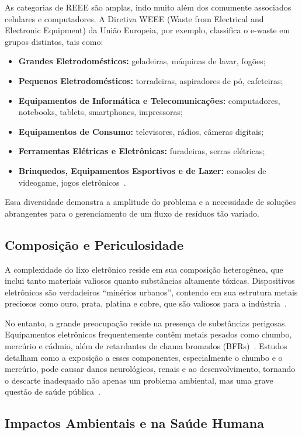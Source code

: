 \documentclass[
	12pt,				%
	openright,			%
	oneside,			%
	a4paper,			%
	english,			%
	brazil				%
	]{abntex2}
\theoremstyle{definition}
\begin{document}
As categorias de REEE são amplas, indo muito além dos comumente associados celulares e computadores. A Diretiva WEEE (Waste from Electrical and Electronic Equipment) da União Europeia, por exemplo, classifica o e-waste em grupos distintos, tais como:
\begin{itemize}
    \item \textbf{Grandes Eletrodomésticos:} geladeiras, máquinas de lavar, fogões;
    \item \textbf{Pequenos Eletrodomésticos:} torradeiras, aspiradores de pó, cafeteiras;
    \item \textbf{Equipamentos de Informática e Telecomunicações:} computadores, notebooks, tablets, smartphones, impressoras;
    \item \textbf{Equipamentos de Consumo:} televisores, rádios, câmeras digitais;
    \item \textbf{Ferramentas Elétricas e Eletrônicas:} furadeiras, serras elétricas;
    \item \textbf{Brinquedos, Equipamentos Esportivos e de Lazer:} consoles de videogame, jogos eletrônicos~\cite{EUWEEE2012}.
\end{itemize}
Essa diversidade demonstra a amplitude do problema e a necessidade de soluções abrangentes para o gerenciamento de um fluxo de resíduos tão variado.

\subsection{Composição e Periculosidade}

A complexidade do lixo eletrônico reside em sua composição heterogênea, que inclui tanto materiais valiosos quanto substâncias altamente tóxicas. Dispositivos eletrônicos são verdadeiros ``minérios urbanos'', contendo em sua estrutura metais preciosos como ouro, prata, platina e cobre, que são valiosos para a indústria~\cite{Robinson2009}.

No entanto, a grande preocupação reside na presença de substâncias perigosas. Equipamentos eletrônicos frequentemente contêm metais pesados como chumbo, mercúrio e cádmio, além de retardantes de chama bromados (BFRs)~\cite{Widmer2005}. Estudos detalham como a exposição a esses componentes, especialmente o chumbo e o mercúrio, pode causar danos neurológicos, renais e ao desenvolvimento, tornando o descarte inadequado não apenas um problema ambiental, mas uma grave questão de saúde pública~\cite{perkins2014b}.

\subsection{Impactos Ambientais e na Saúde Humana}
\end{document}
